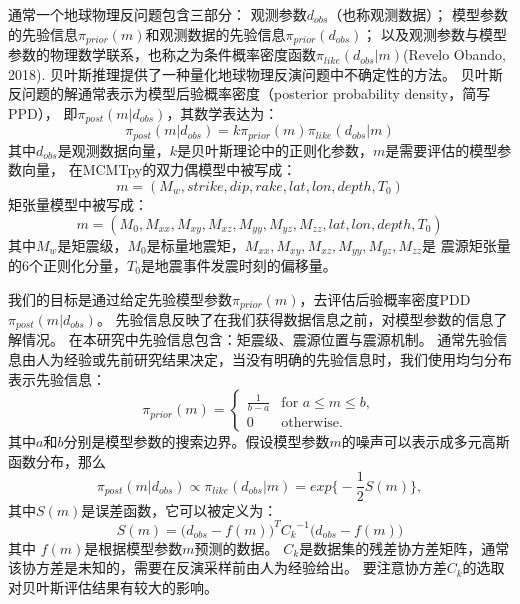 通常一个地球物理反问题包含三部分：
观测参数$d_{obs}$（也称观测数据）；
模型参数的先验信息$\pi_{prior}(m)$和观测数据的先验信息$\pi_{prior}(d_{obs})$；
以及观测参数与模型参数的物理数学联系，也称之为条件概率密度函数$\pi_{like}(d_{obs}|m)$(Revelo Obando, 2018).
贝叶斯推理提供了一种量化地球物理反演问题中不确定性的方法\citep{Zhao2019}。
贝叶斯反问题的解通常表示为模型后验概率密度（posterior probability density，简写PPD），
即$\pi_{post}(m|d_{obs})$，其数学表达为：
\begin{equation}
    \pi_{post}(m|d_{obs})=k \pi_{prior}(m) \pi_{like}(d_{obs}|m)
\end{equation}
其中$d_{obs}$是观测数据向量，$k$是贝叶斯理论中的正则化参数，$m$是需要评估的模型参数向量，
在MCMTpy的双力偶模型中被写成：
\begin{equation}
    m=(M_w,strike,dip,rake,lat,lon,depth,T_0)
\end{equation}
矩张量模型中被写成：
\begin{equation}
    m=(M_0,M_{xx},M_{xy},M_{xz},M_{yy},M_{yz},M_{zz},lat,lon,depth,T_0)
\end{equation}
其中$M_w$是矩震级，$M_0$是标量地震矩，$M_{xx},M_{xy},M_{xz},M_{yy},M_{yz},M_{zz}$是
震源矩张量的6个正则化分量，$T_0$是地震事件发震时刻的偏移量。

我们的目标是通过给定先验模型参数$\pi_{prior}(m)$，去评估后验概率密度PDD $\pi_{post}(m|d_{obs})$。
先验信息反映了在我们获得数据信息之前，对模型参数的信息了解情况\citep{Shen2013}。
在本研究中先验信息包含：矩震级、震源位置与震源机制。
通常先验信息由人为经验或先前研究结果决定，当没有明确的先验信息时，我们使用均匀分布表示先验信息：
\begin{equation}
    \pi_{prior}(m) =
    \begin{cases}
      \frac{1}{b-a} & \text{for } a \le m \le b, \\
      0             & \text{otherwise}.
    \end{cases}
\end{equation}
其中$a$和$b$分别是模型参数的搜索边界。假设模型参数$m$的噪声可以表示成多元高斯函数分布，那么
\begin{equation}
    \pi_{post}(m|d_{obs}) \propto \pi_{like}(d_{obs}|m) = exp \biggl\{ -\frac{1}{2} S(m) \biggr\},
\end{equation}
其中$S(m)$是误差函数，它可以被定义为：
\begin{equation}
    S(m) = \bigl( d_{obs}-f(m) \bigr) ^T {C_k}^{-1} \bigl( d_{obs}-f(m) \bigr) 
\end{equation}
其中 $f(m)$是根据模型参数$m$预测的数据。
$C_k$是数据集的残差协方差矩阵，通常该协方差是未知的，需要在反演采样前由人为经验给出。
要注意协方差$C_k$的选取对贝叶斯评估结果有较大的影响\citep{Duputel2012,Vasyura-Bathke2020}。

